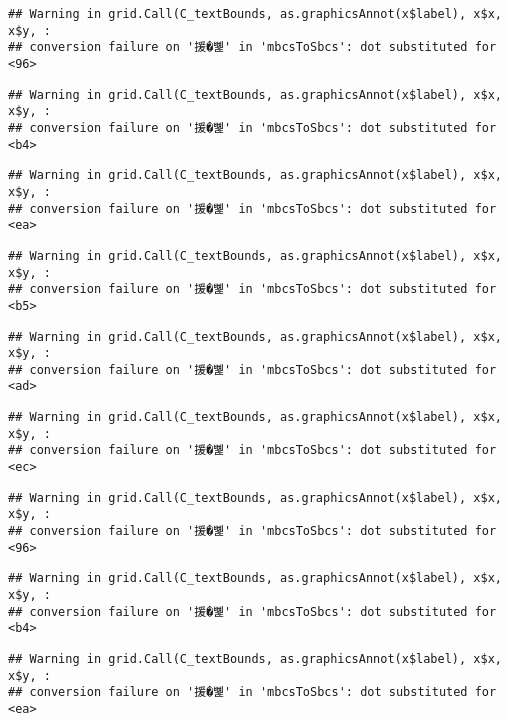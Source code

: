 \documentclass[
]{article}
\begin{document}
\begin{verbatim}
## Warning in grid.Call(C_textBounds, as.graphicsAnnot(x$label), x$x, x$y, :
## conversion failure on '援�뼱' in 'mbcsToSbcs': dot substituted for <96>
\end{verbatim}

\begin{verbatim}
## Warning in grid.Call(C_textBounds, as.graphicsAnnot(x$label), x$x, x$y, :
## conversion failure on '援�뼱' in 'mbcsToSbcs': dot substituted for <b4>
\end{verbatim}

\begin{verbatim}
## Warning in grid.Call(C_textBounds, as.graphicsAnnot(x$label), x$x, x$y, :
## conversion failure on '援�뼱' in 'mbcsToSbcs': dot substituted for <ea>
\end{verbatim}

\begin{verbatim}
## Warning in grid.Call(C_textBounds, as.graphicsAnnot(x$label), x$x, x$y, :
## conversion failure on '援�뼱' in 'mbcsToSbcs': dot substituted for <b5>
\end{verbatim}

\begin{verbatim}
## Warning in grid.Call(C_textBounds, as.graphicsAnnot(x$label), x$x, x$y, :
## conversion failure on '援�뼱' in 'mbcsToSbcs': dot substituted for <ad>
\end{verbatim}

\begin{verbatim}
## Warning in grid.Call(C_textBounds, as.graphicsAnnot(x$label), x$x, x$y, :
## conversion failure on '援�뼱' in 'mbcsToSbcs': dot substituted for <ec>
\end{verbatim}

\begin{verbatim}
## Warning in grid.Call(C_textBounds, as.graphicsAnnot(x$label), x$x, x$y, :
## conversion failure on '援�뼱' in 'mbcsToSbcs': dot substituted for <96>
\end{verbatim}

\begin{verbatim}
## Warning in grid.Call(C_textBounds, as.graphicsAnnot(x$label), x$x, x$y, :
## conversion failure on '援�뼱' in 'mbcsToSbcs': dot substituted for <b4>
\end{verbatim}

\begin{verbatim}
## Warning in grid.Call(C_textBounds, as.graphicsAnnot(x$label), x$x, x$y, :
## conversion failure on '援�뼱' in 'mbcsToSbcs': dot substituted for <ea>
\end{verbatim}
\end{document}
